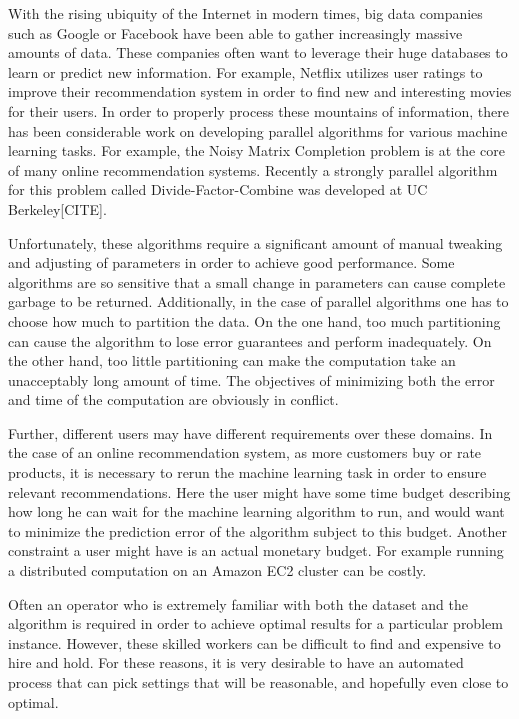 With the rising ubiquity of the Internet in modern times, big data companies such as Google or Facebook have been able to gather increasingly massive amounts of data. These companies often want to leverage their huge databases to learn or predict new information. For example, Netflix utilizes user ratings to improve their recommendation system in order to find new and interesting movies for their users. In order to properly process these mountains of information, there has been considerable work on developing parallel algorithms for various machine learning tasks. For example, the Noisy Matrix Completion problem is at the core of many online recommendation systems. Recently a strongly parallel algorithm for this problem called Divide-Factor-Combine was developed at UC Berkeley[CITE]. 

Unfortunately, these algorithms require a significant amount of manual tweaking and adjusting of parameters in order to achieve good performance. Some algorithms are so sensitive that a small change in parameters can cause complete garbage to be returned. Additionally, in the case of parallel algorithms one has to choose how much to partition the data. On the one hand, too much partitioning can cause the algorithm to lose error guarantees and perform inadequately. On the other hand, too little partitioning can make the computation take an unacceptably long amount of time. The objectives of minimizing both the error and time of the computation are obviously in conflict. 

Further, different users may have different requirements over these domains. In the case of an online recommendation system, as more customers buy or rate products, it is necessary to rerun the machine learning task in order to ensure relevant recommendations. Here the user might have some time budget describing how long he can wait for the machine learning algorithm to run, and would want to minimize the prediction error of the algorithm subject to this budget. Another constraint a user might have is an actual monetary budget. For example running a distributed computation on an Amazon EC2 cluster can be costly.

Often an operator who is extremely familiar with both the dataset and the algorithm is required in order to achieve optimal results for a particular problem instance. However, these skilled workers can be difficult to find and expensive to hire and hold. For these reasons, it is very desirable to have an automated process that can pick settings that will be reasonable, and hopefully even close to optimal. 

